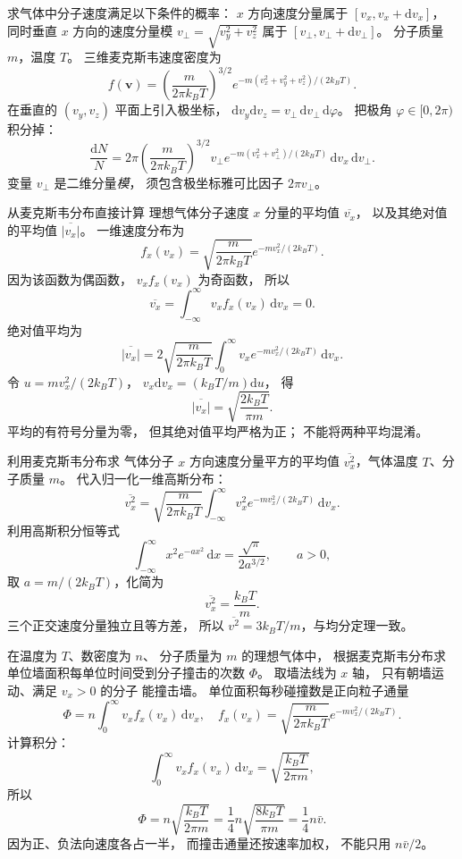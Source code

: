 求气体中分子速度满足以下条件的概率：
$x$ 方向速度分量属于
$[v_x,v_x+\mathrm dv_x]$，
同时垂直 $x$ 方向的速度分量模
$v_\perp=\sqrt{v_y^2+v_z^2}$
属于 $[v_\perp,v_\perp+\mathrm dv_\perp]$。
分子质量 $m$，温度 $T$。
\exsolution
三维麦克斯韦速度密度为
\[
f(\bm v)=
\left(\frac m{2\pi k_BT}\right)^{3/2}
e^{-m(v_x^2+v_y^2+v_z^2)/(2k_BT)}.
\]
在垂直的 $(v_y,v_z)$ 平面上引入极坐标，
$\mathrm dv_y\mathrm dv_z
=v_\perp\,\mathrm dv_\perp\,\mathrm d\varphi$。
把极角 $\varphi\in[0,2\pi)$ 积分掉：
\[
\boxed{\frac{\mathrm dN}{N}
=2\pi\left(\frac m{2\pi k_BT}\right)^{3/2}
v_\perp e^{-m(v_x^2+v_\perp^2)/(2k_BT)}
\,\mathrm dv_x\,\mathrm dv_\perp}.
\]
\excheck 变量 $v_\perp$ 是二维分量\emph{模}，
须包含极坐标雅可比因子 $2\pi v_\perp$。

从麦克斯韦分布直接计算
理想气体分子速度 $x$ 分量的平均值
$\overline{v_x}$，
以及其绝对值的平均值
$\overline{|v_x|}$。
\exsolution
一维速度分布为
\[
f_x(v_x)=\sqrt{\frac m{2\pi k_BT}}
e^{-mv_x^2/(2k_BT)}.
\]
因为该函数为偶函数，
$v_xf_x(v_x)$ 为奇函数，
所以
\[
\boxed{\overline{v_x}
=\int_{-\infty}^{\infty}v_xf_x(v_x)\,\mathrm dv_x=0}.
\]
绝对值平均为
\[
\overline{|v_x|}
=2\sqrt{\frac m{2\pi k_BT}}
\int_0^\infty
v_xe^{-mv_x^2/(2k_BT)}\,\mathrm dv_x.
\]
令
$u=mv_x^2/(2k_BT)$，
$v_x\mathrm dv_x=(k_BT/m)\mathrm du$，
得
\[
\boxed{\overline{|v_x|}
=\sqrt{\frac{2k_BT}{\pi m}}}.
\]
\excheck 平均的有符号分量为零，
但其绝对值平均严格为正；
不能将两种平均混淆。

利用麦克斯韦分布求
气体分子 $x$ 方向速度分量平方的平均值
$\overline{v_x^2}$，气体温度 $T$、分子质量 $m$。
\exsolution
代入归一化一维高斯分布：
\[
\overline{v_x^2}
=\sqrt{\frac m{2\pi k_BT}}
\int_{-\infty}^{\infty}
v_x^2e^{-mv_x^2/(2k_BT)}\,\mathrm dv_x.
\]
利用高斯积分恒等式
\[
\int_{-\infty}^{\infty}x^2e^{-ax^2}\,\mathrm dx
=\frac{\sqrt\pi}{2a^{3/2}},\qquad a>0,
\]
取 $a=m/(2k_BT)$，化简为
\[
\boxed{\overline{v_x^2}=\frac{k_BT}{m}}.
\]
\excheck 三个正交速度分量独立且等方差，
所以 $\overline{v^2}=3k_BT/m$，与均分定理一致。

在温度为 $T$、数密度为 $n$、
分子质量为 $m$ 的理想气体中，
根据麦克斯韦分布求
单位墙面积每单位时间受到分子撞击的次数
$\Phi$。
\exsolution
取墙法线为 $x$ 轴，
只有朝墙运动、满足 $v_x>0$ 的分子
能撞击墙。
单位面积每秒碰撞数是正向粒子通量
\[
\Phi=n\int_0^\infty v_x f_x(v_x)\,\mathrm dv_x,
\quad
f_x(v_x)=\sqrt{\frac m{2\pi k_BT}}
e^{-mv_x^2/(2k_BT)}.
\]
计算积分：
\[
\int_0^\infty v_x f_x(v_x)\,\mathrm dv_x
=\sqrt{\frac{k_BT}{2\pi m}},
\]
所以
\[
\boxed{\Phi=n\sqrt{\frac{k_BT}{2\pi m}}
=\frac14n\sqrt{\frac{8k_BT}{\pi m}}
=\frac14n\bar v}.
\]
\excheck 因为正、负法向速度各占一半，
而撞击通量还按速率加权，
不能只用 $n\bar v/2$。

